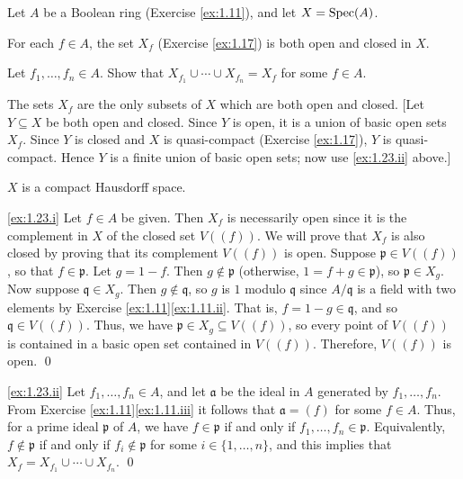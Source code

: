 \newpage







\begin{exercise}
\label{ex:1.23}
Let $A$ be a Boolean ring (Exercise \ref{ex:1.11}), and let $X = \operatorname{Spec}(A)$.
\begin{rlist}
\item
\label{ex:1.23.i}
For each $f \in A$, the set $X_f$ (Exercise \ref{ex:1.17}) is both open and closed in $X$.
\item
\label{ex:1.23.ii}
Let $f_1,\ldots,f_n \in A$.
Show that $X_{f_1} \cup \cdots \cup X_{f_n} = X_f$ for some $f \in A$.
\item
\label{ex:1.23.iii}
The sets $X_f$ are the only subsets of $X$ which are both open and closed.
[Let $Y \subseteq X$ be both open and closed.
Since $Y$ is open, it is a union of basic open sets $X_f$.
Since $Y$ is closed and $X$ is quasi-compact (Exercise \ref{ex:1.17}), $Y$ is quasi-compact.
Hence $Y$ is a finite union of basic open sets; now use \ref{ex:1.23.ii} above.]
\item
\label{ex:1.23.iv}
$X$ is a compact Hausdorff space.
\end{rlist}
\end{exercise}

\noindent
\ref{ex:1.23.i}
Let $f \in A$ be given.
Then $X_f$ is necessarily open since it is the complement in $X$ of the closed set $V((f))$.
We will prove that $X_f$ is also closed by proving that its complement $V((f))$ is open.
Suppose $\mathfrak p \in V((f))$, so that $f \in \mathfrak p$.
Let $g = 1 - f$.
Then $g \notin \mathfrak p$ (otherwise, $1 = f + g \in \mathfrak p$), so $\mathfrak p \in X_g$.
Now suppose $\mathfrak q \in X_g$.
Then $g \notin \mathfrak q$, so $g$ is $1$ modulo $\mathfrak q$ since $A/\mathfrak q$ is a field with two elements by Exercise \ref{ex:1.11}\ref{ex:1.11.ii}.
That is, $f = 1 - g \in \mathfrak q$, and so $\mathfrak q \in V((f))$.
Thus, we have $\mathfrak p \in X_g \subseteq V((f))$, so every point of $V((f))$ is contained in a basic open set contained in $V((f))$.
Therefore, $V((f))$ is open.
\qed

\noindent
\ref{ex:1.23.ii}
Let $f_1,\ldots,f_n \in A$, and let $\mathfrak a$ be the ideal in $A$ generated by $f_1,\ldots,f_n$.
From Exercise \ref{ex:1.11}\ref{ex:1.11.iii} it follows that $\mathfrak a = (f)$ for some $f \in A$.
Thus, for a prime ideal $\mathfrak p$ of $A$, we have $f \in \mathfrak p$ if and only if $f_1,\ldots,f_n \in \mathfrak p$.
Equivalently, $f \notin \mathfrak p$ if and only if $f_i \notin \mathfrak p$ for some $i\in\{1,\ldots,n\}$, and this implies that $X_f = X_{f_1}\cup \cdots \cup X_{f_n}$.
\qed

